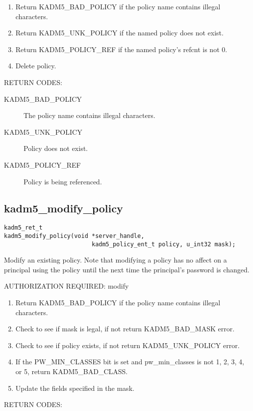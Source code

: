 \begin{enumerate}
\item Return KADM5_BAD_POLICY if the policy name contains illegal
characters.
\item Return KADM5_UNK_POLICY if the named policy does not exist.
\item Return KADM5_POLICY_REF if the named policy's refcnt is not 0.
\item Delete policy.
\end{enumerate}

RETURN CODES:

\begin{description}
\item[KADM5_BAD_POLICY] The policy name contains illegal characters.
\item[KADM5_UNK_POLICY] Policy does not exist.
\item[KADM5_POLICY_REF] Policy is being referenced. 
\end{description}

\subsection{kadm5_modify_policy}

\begin{verbatim}
kadm5_ret_t
kadm5_modify_policy(void *server_handle,
                         kadm5_policy_ent_t policy, u_int32 mask);
\end{verbatim}

Modify an existing policy.  Note that modifying a policy has no affect
on a principal using the policy until the next time the principal's
password is changed.

AUTHORIZATION REQUIRED: modify

\begin{enumerate}
\item Return KADM5_BAD_POLICY if the policy name contains illegal
characters.
\item Check to see if mask is legal, if not return KADM5_BAD_MASK error.
\item Check to see if policy exists, if not return
KADM5_UNK_POLICY error.
\item If the PW_MIN_CLASSES bit is set and pw_min_classes is not 1, 2,
3, 4, or 5, return KADM5_BAD_CLASS.
\item Update the fields specified in the mask.
\end{enumerate}

RETURN CODES: 

